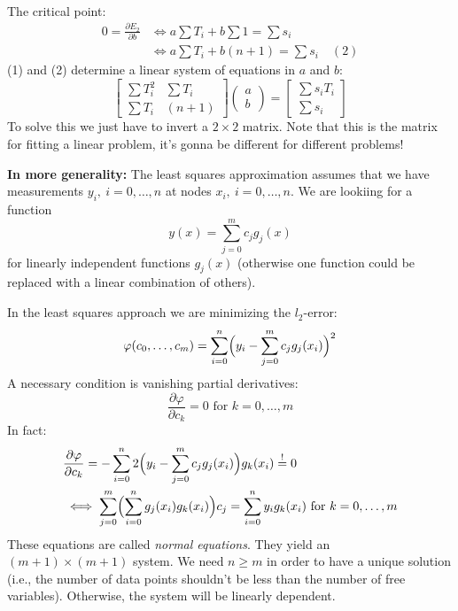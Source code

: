 \begin{example}
\begin{itemize}
{\begin{align*}
            \end{align*}
            The critical point:
            \begin{align*}
                0 = \frac{\partial E_2}{\partial b} 
                &\iff a \sum T_i + b \sum 1 = \sum s_i \\
                &\iff a \sum T_i + b(n + 1) = \sum s_i \quad (2)
            \end{align*}
            (1) and (2) determine a linear system of equations in $a$ and $b$:
            \[
                \begin{bmatrix}
                    \sum T_i^2 & \sum T_i\\
                    \sum T_i & (n + 1)
                \end{bmatrix}
                \begin{pmatrix}
                    a \\ b
                \end{pmatrix} = \begin{bmatrix}
                    \sum s_i T_i\\ \sum s_i
                \end{bmatrix}
            \]
            To solve this we just have to invert a $2 \times 2$ matrix.
            Note that this is the matrix for fitting a linear problem, it's 
            gonna be different for different problems!
        }
    \end{itemize}
\end{example}

\textbf{In more generality:}
The least squares approximation assumes that we have measurements $y_i,\ i = 0,\dots, n$
at nodes $x_i,\ i = 0,\dots, n$. We are lookiing for a function
\[
    y(x) = \sum_{j=0}^m c_j g_j(x)
\]
for linearly independent functions $g_j(x)$ (otherwise one function could be replaced
with a linear combination of others).

In the least squares approach we are minimizing the $l_2$-error:
\[
    \varphi(c_0, \dots, c_m) = \sum_{i = 0}^n \Bigl(
        y_i - \sum_{j=0}^m c_j g_j(x_i)
    \Bigr)^2
\]
A necessary condition is vanishing partial derivatives:
\[ \frac{\partial \varphi}{\partial c_k} = 0 \text{ for } k = 0, \dots, m\]
In fact:
\begin{align*}
    &\frac{\partial \varphi}{\partial c_k} =
    -\sum_{i=0}^n 2 \Bigl(y_i - \sum_{j=0}^m c_j g_j(x_i)\Bigr) g_k(x_i) \overset{!}{=} 0
    \\&\iff \sum_{j=0}^m \Bigl(
        \sum_{i=0}^n g_j(x_i) g_k(x_i)
    \Bigr) c_j = \sum_{i=0}^n y_i g_k(x_i)
    \text{ for } k = 0,\dots, m
\end{align*}
These equations are called \textit{normal equations}.
They yield an $(m + 1) \times (m + 1)$ system.
We need $n \ge m$ in order to have a unique solution (i.e.,
the number of data points shouldn't be less than the number of free variables).
Otherwise, the system will be linearly dependent.


